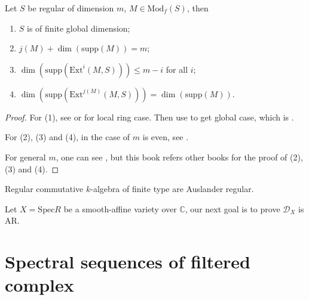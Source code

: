 \begin{theorem}[Auslander]\label{theorem 7.2}
    Let $S$ be regular of dimension $m$, $M \in \mathrm{Mod}_{f}(S)$, then
    \begin{enumerate}
        \item $S$ is of finite global dimension;
        \item $j(M) + \dim(\mathrm{supp}(M)) = m$;
        \item $\dim(\mathrm{supp}(\mathrm{Ext}^{i}(M,S))) \le m - i$ for all $i$;
        \item $\dim(\mathrm{supp}(\mathrm{Ext}^{j(M)}(M,S))) = \dim(\mathrm{supp}(M))$.
    \end{enumerate}
\end{theorem}
\begin{proof}
    \mbox{}

    For (1), see \cite[Thm.~19.12.]{eisenbud1995commutative} or \cite[\href{https://stacks.math.columbia.edu/tag/00OC}{Tag 00OC}]{stacks-project} for local ring case.
    Then use \cite[\href{https://stacks.math.columbia.edu/tag/00O9}{Tag 00O9}]{stacks-project} to get global case, which is \cite[\href{https://stacks.math.columbia.edu/tag/00OE}{Tag 00OE}]{stacks-project}.

    For (2), (3) and (4), in the case of $m$ is even, see \cite[Prop.~6.4.]{schnell_dmodules_notes}.

    For general $m$, one can see \cite[Thm.~D.4.4.]{hotta2008d}, but this book refers other books for the proof of (2), (3) and (4).
\end{proof}
\begin{corollary}
    Regular commutative $k$-algebra of finite type are Auslander regular.
\end{corollary}

Let $X = \mathrm{Spec } R$ be a smooth-affine variety over $\mathbb{C}$, our next goal is to prove $\mathcal{D}_{X}$ is AR.

\section{Spectral sequences of filtered complex}

